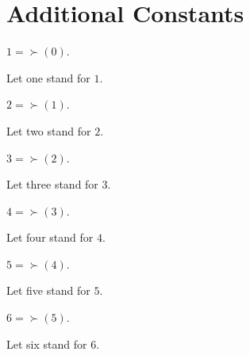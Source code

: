 \documentclass[10pt]{article}
\begin{document}
  \section{Additional Constants}

  \begin{forthel}
    \begin{definition}
      $1 = \succ(0)$.
    \end{definition}

    Let one stand for $1$.
  \end{forthel}

  \begin{forthel}
    \begin{definition}
      $2 = \succ(1)$.
    \end{definition}

    Let two stand for $2$.
  \end{forthel}

  \begin{forthel}
    \begin{definition}
      $3 = \succ(2)$.
    \end{definition}

    Let three stand for $3$.
  \end{forthel}

  \begin{forthel}
    \begin{definition}
      $4 = \succ(3)$.
    \end{definition}

    Let four stand for $4$.
  \end{forthel}

  \begin{forthel}
    \begin{definition}
      $5 = \succ(4)$.
    \end{definition}

    Let five stand for $5$.
  \end{forthel}

  \begin{forthel}
    \begin{definition}
      $6 = \succ(5)$.
    \end{definition}

    Let six stand for $6$.
  \end{forthel}
\end{document}
